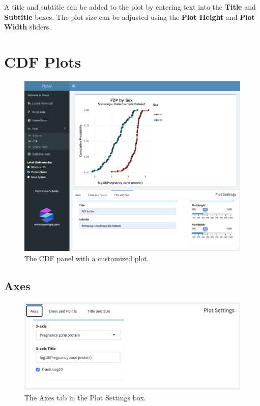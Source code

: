 \documentclass[
]{book}
\begin{document}
A title and subtitle can be added to the plot by entering text into the \textbf{Title} and \textbf{Subtitle} boxes. The plot size can be adjusted using the \textbf{Plot Height} and \textbf{Plot Width} sliders.

\hypertarget{cdf-plots}{%
\section{CDF Plots}\label{cdf-plots}}

\begin{figure}
\centering
\includegraphics{images/CDF_Panel.png}
\caption{The CDF panel with a customized plot.}
\end{figure}

\hypertarget{axes-1}{%
\subsection{Axes}\label{axes-1}}

\begin{figure}
\centering
\includegraphics{images/CDF_Axes.png}
\caption{The Axes tab in the Plot Settings box.}
\end{figure}
\end{document}
